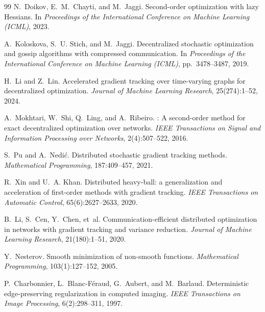 \documentclass[review,onefignum,onetabnum]{siamart171218}
\begin{document}
\begin{thebibliography}{99}
		N.~Doikov, E.~M.~Chayti, and M.~Jaggi.
		\newblock Second-order optimization with lazy {H}essians.
		\newblock In \textit{Proceedings of the International Conference on Machine Learning (ICML)}, 2023.
		
		A.~Koloskova, S.~U. Stich, and M.~Jaggi.
		\newblock Decentralized stochastic optimization and gossip algorithms with compressed communication.
		\newblock In \textit{Proceedings of the International Conference on Machine Learning (ICML)}, pp.~3478--3487, 2019.
		
		H.~Li and Z.~Lin.
		\newblock Accelerated gradient tracking over time-varying graphs for decentralized optimization.
		\newblock \textit{Journal of Machine Learning Research}, 25(274):1--52, 2024.
		
		A.~Mokhtari, W.~Shi, Q.~Ling, and A.~Ribeiro.
		: A second-order method for exact decentralized optimization over networks.
		\newblock \textit{IEEE Transactions on Signal and Information Processing over Networks}, 2(4):507--522, 2016.
		
		S.~Pu and A.~Nedi{\'c}.
		\newblock Distributed stochastic gradient tracking methods.
		\newblock \textit{Mathematical Programming}, 187:409--457, 2021.
		
		R.~Xin and U.~A. Khan.
		\newblock Distributed heavy-ball: a generalization and acceleration of first-order methods with gradient tracking.
		\newblock \textit{IEEE Transactions on Automatic Control}, 65(6):2627--2633, 2020.
		
		B.~Li, S.~Cen, Y.~Chen, et~al.
		\newblock Communication-efficient distributed optimization in networks with gradient tracking and variance reduction.
		\newblock \textit{Journal of Machine Learning Research}, 21(180):1--51, 2020.
		
		Y.~Nesterov.
		\newblock Smooth minimization of non-smooth functions.
		\newblock \textit{Mathematical Programming}, 103(1):127--152, 2005.
		
		P.~Charbonnier, L.~Blanc-F{\'e}raud, G.~Aubert, and M.~Barlaud.
		\newblock Deterministic edge-preserving regularization in computed imaging.
		\newblock \textit{IEEE Transactions on Image Processing}, 6(2):298--311, 1997.
		

\end{thebibliography}
\end{document}
